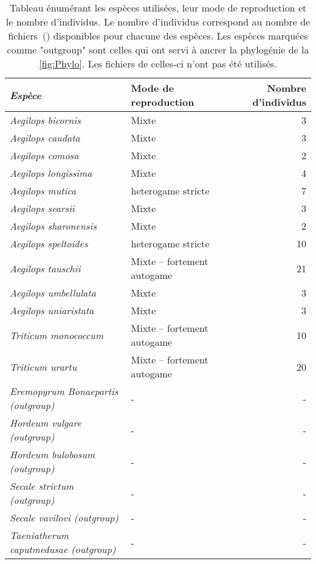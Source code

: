 \documentclass[../main]{subfiles} %
\begin{document}
\addto\extrasfrench{\protected\edef:{\unexpanded\expandafter{:}}}

\begin{table}[ht]
    \centering
    \begin{tabular}{>{\itshape}l l r}
        \toprule
        Espèce & Mode de reproduction & Nombre d’individus \\
        \midrule
        Aegilops bicornis & Mixte & 3 \\
        Aegilops caudata & Mixte & 3 \\
        Aegilops comosa & Mixte & 2 \\
        Aegilops longissima & Mixte & 4 \\
        Aegilops mutica & \Gls{heterogame}  stricte & 7 \\
        Aegilops searsii & Mixte & 3 \\
        Aegilops sharonensis & Mixte & 2 \\
        Aegilops speltoides & \Gls{heterogame}  stricte & 10 \\
        Aegilops tauschii & Mixte – fortement \gls{autogame} & 21 \\
        Aegilops umbellulata & Mixte & 3 \\
        Aegilops uniaristata & Mixte & 3 \\
        Triticum monococcum & Mixte – fortement \gls{autogame} & 10 \\
        Triticum urartu & Mixte – fortement \gls{autogame} & 20 \\
        
	Eremopyrum Bonaepartis (\gls{outgroup}) & - & - \\
        Hordeum vulgare (\gls{outgroup}) & - & - \\
        Hordeum bulobosum (\gls{outgroup})  & - & - \\
        Secale strictum (\gls{outgroup}) & - & - \\
        Secale vavilovi (\gls{outgroup}) & - & - \\
        Taeniatherum caputmedusae (\gls{outgroup}) & - & - \\
        \bottomrule

        
    \end{tabular}
    \caption{Tableau énumérant les espèces utilisées, leur mode de reproduction et le nombre d'individus. Le nombre d'individus correspond au nombre de fichiers \bam\,(\OldBam) disponibles pour chacune des espèces. Les espèces marquées comme "\gls{outgroup}" sont celles qui ont servi à ancrer la phylogénie de la \cref{fig:Phylo}. Les fichiers \bam de celles-ci n'ont pas été utilisés.
    \label{tab:Especes}
    }

    
\end{table}

\end{document}
